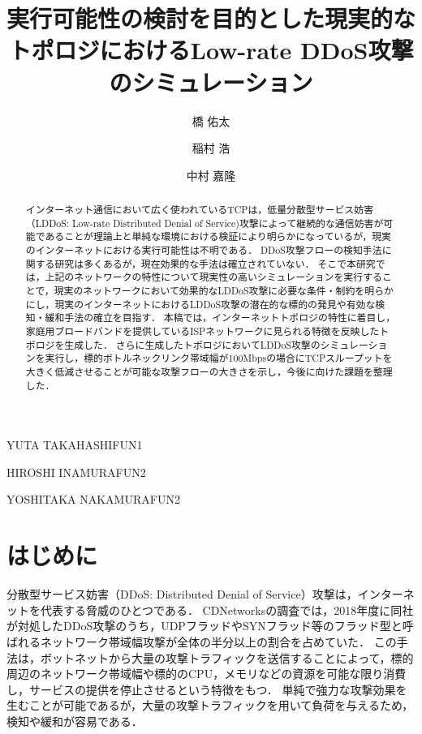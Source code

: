 \documentclass[Japanese]{dicomopapers}
\begin{document}
\title{実行可能性の検討を目的とした現実的なトポロジにおけるLow-rate DDoS攻撃のシミュレーション}


\author{橋 佑太}{YUTA TAKAHASHI}{FUN1}
\author{稲村 浩}{HIROSHI INAMURA}{FUN2}
\author{中村 嘉隆}{YOSHITAKA NAKAMURA}{FUN2}

\begin{abstract}
インターネット通信において広く使われているTCPは，低量分散型サービス妨害（LDDoS: Low-rate Distributed Denial of Service)攻撃によって継続的な通信妨害が可能であることが理論上と単純な環境における検証により明らかになっているが，現実のインターネットにおける実行可能性は不明である．
DDoS攻撃フローの検知手法に関する研究は多くあるが，現在効果的な手法は確立されていない．
そこで本研究では，上記のネットワークの特性について現実性の高いシミュレーションを実行することで，現実のネットワークにおいて効果的なLDDoS攻撃に必要な条件・制約を明らかにし，現実のインターネットにおけるLDDoS攻撃の潜在的な標的の発見や有効な検知・緩和手法の確立を目指す．
本稿では，インターネットトポロジの特性に着目し，家庭用ブロードバンドを提供しているISPネットワークに見られる特徴を反映したトポロジを生成した．
さらに生成したトポロジにおいてLDDoS攻撃のシミュレーションを実行し，標的ボトルネックリンク帯域幅が100Mbpsの場合にTCPスループットを大きく低減させることが可能な攻撃フローの大きさを示し，今後に向けた課題を整理した．
\end{abstract}

\maketitle

\section{はじめに}
分散型サービス妨害（DDoS: Distributed Denial of Service）攻撃は，インターネットを代表する脅威のひとつである．
CDNetworksの調査では，2018年度に同社が対処したDDoS攻撃のうち，UDPフラッドやSYNフラッド等のフラッド型と呼ばれるネットワーク帯域幅攻撃が全体の半分以上の割合を占めていた\cite{cdn}．
この手法は，ボットネットから大量の攻撃トラフィックを送信することによって，標的周辺のネットワーク帯域幅や標的のCPU，メモリなどの資源を可能な限り消費し，サービスの提供を停止させるという特徴をもつ．
単純で強力な攻撃効果を生むことが可能であるが，大量の攻撃トラフィックを用いて負荷を与えるため，検知や緩和が容易である．
\end{document}
